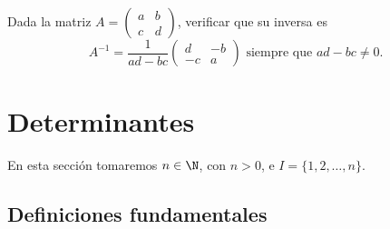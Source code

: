 \documentclass[compacto,10pt]{pubciencias-notas}
\begin{document}

\begin{ejer}\hspace{0pt} 
Dada la matriz $A = \begin{pmatrix}a&b\\c&d\end{pmatrix}$, verificar que su inversa es  
\[
    A^{-1} = \dfrac{1}{ad - bc}\begin{pmatrix}d&-b\\-c&a\end{pmatrix} \text{   siempre que   } ad - bc \neq 0.
\]
\end{ejer}

\setcounter{section}{2}
\section{Determinantes}

En esta sección tomaremos $n\in \N$, con $n>0$, e $I = \{ 1, 2, \ldots, n\}$.

\subsection{Definiciones fundamentales}
\end{document}
